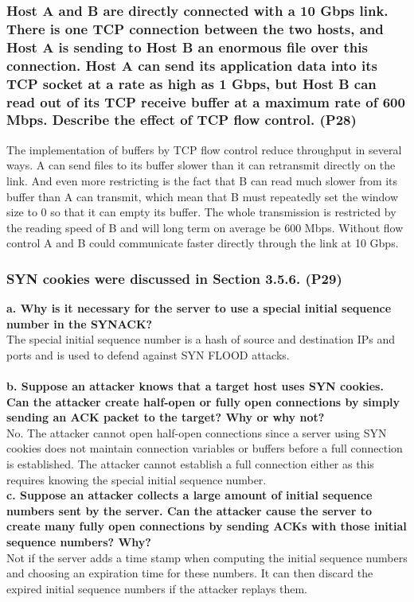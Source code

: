 \subsubsection{Host A and B are directly connected with a 10 Gbps link. There is one TCP connection between the two hosts, and Host A is sending to Host B an enormous file over this connection. Host A can send its application data into its TCP socket at a rate as high as 1 Gbps, but Host B can read out of its TCP receive buffer at a maximum rate of 600 Mbps. Describe the effect of TCP flow control. (P28)}

The implementation of buffers by TCP flow control reduce throughput in several ways. A can send files to its buffer slower than it can retransmit directly on the link. And even more restricting is the fact that B can read much slower from its buffer than A can transmit, which mean that B must repeatedly set the window size to 0 so that it can empty its buffer. The whole transmission is restricted by the reading speed of B and will long term on average be 600 Mbps. Without flow control A and B could communicate faster directly through the link at 10 Gbps.



\subsubsection{SYN cookies were discussed in Section 3.5.6. (P29)}

\textbf{a. Why is it necessary for the server to use a special initial sequence number in the SYNACK?} \\
The special initial sequence number is a hash of source and destination IPs and ports and is used to defend against SYN FLOOD attacks. \\
\\
\textbf{b. Suppose an attacker knows that a target host uses SYN cookies. Can the attacker create half-open or fully open connections by simply sending an ACK packet to the target? Why or why not?} \\
No. The attacker cannot open half-open connections since a server using SYN cookies does not maintain connection variables or buffers before a full connection is established. The attacker cannot establish a full connection either as this requires knowing the special initial sequence number.
\\
\textbf{c. Suppose an attacker collects a large amount of initial sequence numbers sent by the server. Can the attacker cause the server to create many fully open connections by sending ACKs with those initial sequence numbers? Why?} \\
Not if the server adds a time stamp when computing the initial sequence numbers and choosing an expiration time for these numbers. It can then discard the expired initial sequence numbers if the attacker replays them.



